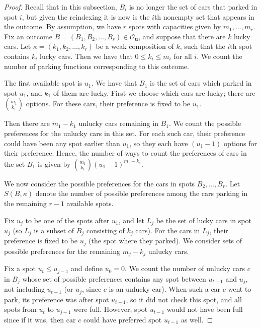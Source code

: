 \documentclass[10pt,a4paper]{amsart}
\newcommand{\bsy}{\boldsymbol}
\newcommand{\out}{\mathcal{O}}
\begin{document}
\begin{proof}
Recall that in this subsection, $B_i$ is no longer the set of cars that parked in spot $i$, but given the reindexing it is now is the $i$th nonempty set that appears in the outcome. 
By assumption, we have $r$ spots with capacities given by $m_1,\ldots, m_r$. Fix an outcome $B =(B_1,B_2,\ldots, B_r)\in\out_{\bsy{u}}$, and suppose that there are $k$ lucky cars. Let $\kappa = (k_1,k_2,\ldots, k_r)$ be a weak composition of $k$, such that the $i$th spot contains $k_i$ lucky cars. Then we have that $0 \leq k_i \leq m_i$ for all $i$.
We count the number of parking functions corresponding to this outcome.

The first available spot is $u_1$.
We have that $B_1$ is the set of cars which parked in spot $u_1$, and $k_1$ of them are lucky. 
First we choose which cars are lucky; there are $ \binom{m_1}{k_1}$ options. For these cars, their preference is fixed to be $u_1$. 

Then there are $m_1-k_1$ unlucky cars remaining in $B_1$. We count the possible preferences for the unlucky cars in this set. 
For each such car, their preference could have been any spot earlier than $u_1$, so they each have $(u_1-1)$ options for their preference. Hence, the number of ways to count the preferences of cars in the set $B_1$ is given by 
$\binom{m_1}{k_1}(u_1-1)^{m_1-k_1}$.

We now consider the possible preferences for the cars in spots $B_2,\ldots, B_r$. Let $S(B,\kappa)$ denote the number of possible preferences among the cars parking in the remaining $r-1$ available spots.

Fix $u_j$ to be one of the spots after $u_1$, and let $L_j$ be the set of lucky cars in spot $u_j$ (so $L_j$ is a subset of $B_j$ consisting of $k_j$ cars). 
For the cars in $L_j$, their preference is fixed to be $u_j$ (the spot where they parked). 
We consider sets of  possible preferences for the remaining $m_j-k_j$ unlucky cars.



Fix a spot $u_t\leq u_{j-1}$ and define $u_0 =0$. 
We count the number of unlucky cars $c$ in $B_j$ whose set of possible preferences contains any spot between $u_{t-1}$ and $u_j$, not including $u_{t-1}$ (or $u_j$, since $c$ is an unlucky car). When such a car $c$ went to park, its preference was after spot $u_{t-1}$, so it did not check this spot, and all spots from $u_t$ to $u_{j-1}$ were full. However, spot $u_{t-1}$ would not have been full since if it was, then car $c$ could have preferred spot $u_{t-1}$ as well. 


\end{proof}
\end{document}

